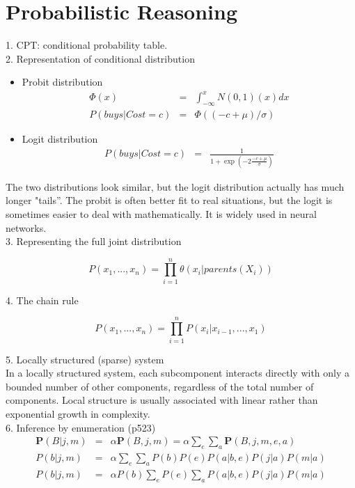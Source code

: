 \documentclass[12pt]{article}
\begin{document}
\section{Probabilistic Reasoning}

1. CPT: conditional probability table. \\

2. Representation of conditional distribution

\begin{itemize}
  \item Probit distribution
    \begin{eqnarray*}
      \Phi(x) &=& \int^x_{-\infty} N(0,1)(x)dx \\
      P(buys | Cost = c) &=& \Phi((-c + \mu) / \sigma)
    \end{eqnarray*}
  \item Logit distribution
    \begin{eqnarray*}
      P(buys | Cost = c) &=&
      \frac {1}{1 + \exp(-2 \frac {-c + \mu}{\sigma})}
    \end{eqnarray*}
\end{itemize}

The two distributions look similar, but the logit distribution actually has much longer "tails''. The probit is often better fit to real situations, but the logit is sometimes easier to deal with mathematically. It is widely used in neural networks. \\

3. Representing the full joint distribution

\begin{equation*}
P(x_1,...,x_n) = \prod^n_{i=1} \theta(x_i | parents(X_i))
\end{equation*}

4. The chain rule

\begin{equation*}
P(x_1,...,x_n) = \prod^n_{i=1} P(x_i | x_{i-1},...,x_1)
\end{equation*}

5. Locally structured (sparse) system \\

In a locally structured system, each subcomponent interacts directly with only a bounded number of other components, regardless of the total number of components. Local structure is usually associated with linear rather than exponential growth in complexity. \\

6. Inference by enumeration (p523)
\begin{eqnarray*}
\boldsymbol{P}(B|j,m)
&=& \alpha \boldsymbol{P}(B,j,m)
= \alpha \sum_e \sum_a \boldsymbol{P}(B,j,m,e,a) \\
P(b|j,m)
&=& \alpha \sum_e \sum_a P(b) P(e) P(a|b,e) P(j|a) P(m|a) \\
P(b|j,m)
&=& \alpha P(b) \sum_e P(e) \sum_a P(a|b,e) P(j|a) P(m|a)
\end{eqnarray*}
\end{document}
